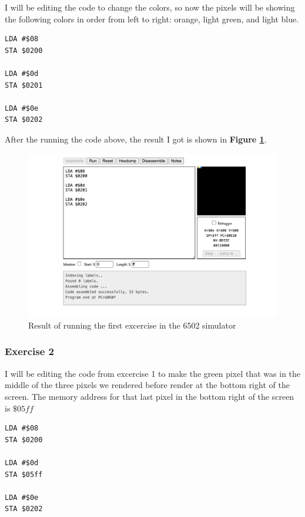\documentclass[a4paper]{article}
\begin{document}
I will be editing the code to change the colors, so now the pixels will be showing the following colors in order from left to right: orange, light green, and light blue.

\begin{lstlisting}[style=6502asm]
LDA #$08
STA $0200

LDA #$0d
STA $0201

LDA #$0e
STA $0202
\end{lstlisting}

After the running the code above, the result I got is shown in \textbf{Figure \ref{fig:04-exercise-1}}.

\begin{figure}[H]
    \centering
    \includegraphics[width=1.0\textwidth]{res/images/q2/04-exercise-1.png}
    \caption{Result of running the first excercise in the 6502 simulator}
    \label{fig:04-exercise-1}
\end{figure}

\subsubsection{Exercise 2}

I will be editing the code from excercise 1 to make the green pixel that was in the middle of the three pixels we rendered before render at the bottom right of the screen. The memory address for that last pixel in the bottom right of the screen is $\$05ff$

\begin{lstlisting}[style=6502asm]
LDA #$08
STA $0200

LDA #$0d
STA $05ff

LDA #$0e
STA $0202
\end{lstlisting}
\end{document}

